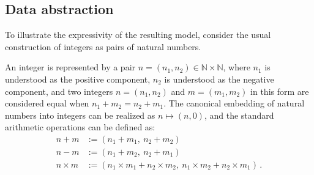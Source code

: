 \documentclass[11pt,oneside,draft]{book}
\theoremstyle{definition}
\begin{document}

\subsection{Data abstraction} \label{sec:fspec-ab} %

To illustrate the expressivity of the resulting model,
consider the usual construction of integers
as pairs of natural numbers.

An integer is represented by a pair
$n = (n_1, n_2) \in \mathbb{N} \times \mathbb{N}$,
where
$n_1$ is understood as the positive component,
$n_2$ is understood as the negative component,
and two integers $n = (n_1, n_2)$ and $m = (m_1, m_2)$
in this form
are considered equal when
$n_1 + m_2 = n_2 + m_1$.
The canonical embedding of natural numbers into integers
can be realized as $n \mapsto (n, 0)$, and
the standard arithmetic operations can be defined as:
\begin{align*}
  n + m &:= (n_1 + m_1, \: n_2 + m_2) \\
  n - m &:= (n_1 + m_2, \: n_2 + m_1) \\
  n \times m &:= (n_1 \times m_1 + n_2 \times m_2, \:
    n_1 \times m_2 + n_2 \times m_1)
  \,.
\end{align*}
\end{document}
